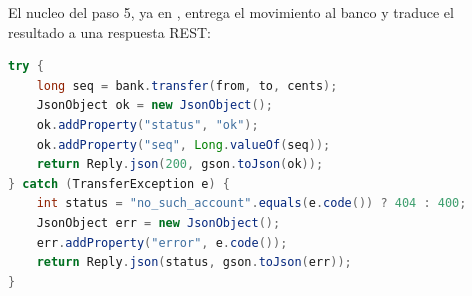 El nucleo del paso 5, ya en , entrega el
movimiento al banco y traduce el resultado a una respuesta REST:

\begin{lstlisting}[language=Java,caption={TransferEndpoint.serve: del banco a la respuesta HTTP}]
try {
    long seq = bank.transfer(from, to, cents);
    JsonObject ok = new JsonObject();
    ok.addProperty("status", "ok");
    ok.addProperty("seq", Long.valueOf(seq));
    return Reply.json(200, gson.toJson(ok));
} catch (TransferException e) {
    int status = "no_such_account".equals(e.code()) ? 404 : 400;
    JsonObject err = new JsonObject();
    err.addProperty("error", e.code());
    return Reply.json(status, gson.toJson(err));
}
\end{lstlisting}
